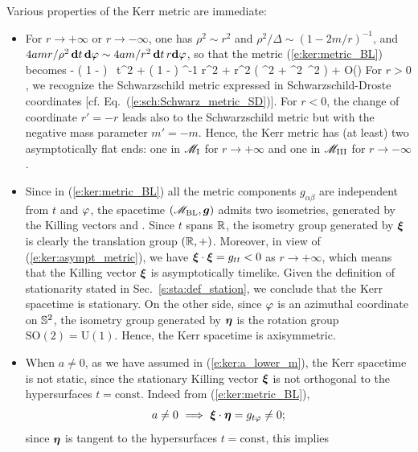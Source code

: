Various properties of the Kerr metric are immediate:
\begin{itemize}
\item For $r\rightarrow+\infty$ or $r\rightarrow-\infty$, one has $\rho^2\sim r^2$ and
$\rho^2/\Delta \sim (1-2m/r)^{-1}$,
and $4 a m  r / \rho^2\,  \mathbf{d} t\, \mathbf{d}\varphi \sim 4 a m/r^2 \,  \mathbf{d} t\, r\mathbf{d}\varphi$,
so that the metric (\ref{e:ker:metric_BL}) becomes
\be \label{e:ker:asympt_metric}
      \simeq  - \left( 1 -  \right) \, \dd t^2
    + \left( 1 -  \right) ^{-1} \dd r^2
    + r^2 \left( \dd \th^2 + \sin^2\th  \, \dd \ph^2 \right)
    + O\left(\right)
\ee
For $r>0$, we recognize the Schwarzschild metric expressed
in Schwarzschild-Droste coordinates [cf. Eq.~(\ref{e:sch:Schwarz_metric_SD})].
For $r<0$, the change of coordinate $r'=-r$ leads also to the Schwarzschild metric
but with the negative mass parameter $m'=-m$.
Hence, the Kerr metric has (at least) two asymptotically flat ends: one in
$\mathscr{M}_{\rm I}$ for $r\rightarrow + \infty$ and one in $\mathscr{M}_{\rm III}$ for
$r\rightarrow - \infty$.
\item Since in (\ref{e:ker:metric_BL}) all the metric components $g_{\alpha\beta}$ are independent from $t$ and $\varphi$, the
spacetime $(\mathscr{M}_{\rm BL},\bm{g})$ admits two isometries, generated by the Killing
vectors
\be \label{e:ker:def_xi_eta}
     \quad\mbox{and}\quad
    \encadre{\w{\eta} := \wpar_\ph}.
\ee
Since $t$ spans $\mathbb{R}$, the isometry group generated by $\bm{\xi}$ is clearly
the translation group $(\mathbb{R},+)$. Moreover, in
view of (\ref{e:ker:asympt_metric}), we have $\bm{\xi}\cdot\bm{\xi} = g_{tt} < 0$
as $r\rightarrow +\infty$, which means that the Killing vector $\bm{\xi}$
is asymptotically timelike. Given the definition of stationarity stated in
Sec.~\ref{s:sta:def_station}, we conclude that the Kerr spacetime is
stationary.
On the other side, since $\varphi$ is an azimuthal coordinate
on $\mathbb{S}^2$, the isometry group generated by $\bm{\eta}$ is the rotation
group $\mathrm{SO}(2) = \mathrm{U}(1)$.
Hence, the Kerr spacetime is axisymmetric.
\item When $a\not=0$, as we have assumed in (\ref{e:ker:a_lower_m}), the
Kerr spacetime is not static, since the stationary Killing vector $\bm{\xi}$
is not orthogonal to the hypersurfaces $t=\mathrm{const}$. Indeed
from (\ref{e:ker:metric_BL}),
\[
    a\not=0 \ \Longrightarrow \ \bm{\xi}\cdot\bm{\eta} = g_{t\varphi} \not=0 ;
\]
since $\bm{\eta}$ is tangent to the hypersurfaces $t=\mathrm{const}$, this implies

\end{itemize}
